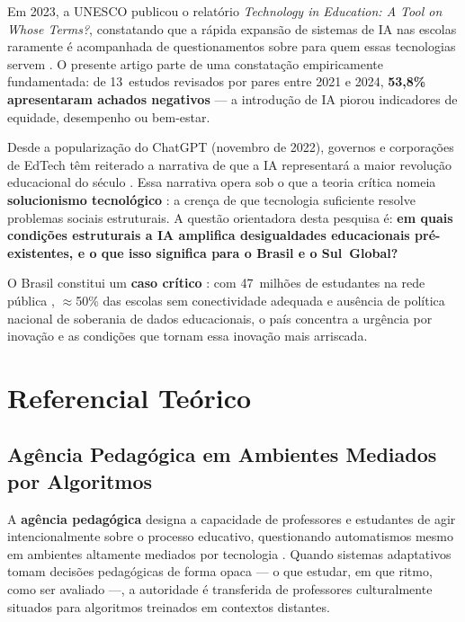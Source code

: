 \documentclass[preprint,12pt,authoryear]{elsarticle}
\begin{document}
Em 2023, a UNESCO publicou o relatório \textit{Technology in
Education: A Tool on Whose Terms?}, constatando que a rápida
expansão de sistemas de IA nas escolas raramente é acompanhada
de questionamentos sobre para quem essas tecnologias servem
\citep{UNESCO2023}.
O presente artigo parte de uma constatação empiricamente fundamentada:
de 13~estudos revisados por pares entre 2021 e 2024,
\textbf{53,8\% apresentaram achados negativos} --- a introdução de
IA piorou indicadores de equidade, desempenho ou bem-estar.

Desde a popularização do ChatGPT (novembro de 2022), governos
e corporações de EdTech têm reiterado a narrativa de que a IA
representará a maior revolução educacional do século
\citep{Holmes2022}.
Essa narrativa opera sob o que a teoria crítica nomeia
\textbf{solucionismo tecnológico} \citep{Morozov2013}: a crença
de que tecnologia suficiente resolve problemas sociais estruturais.
A questão orientadora desta pesquisa é: \textbf{em quais condições
estruturais a IA amplifica desigualdades educacionais pré-existentes,
e o que isso significa para o Brasil e o Sul~Global?}

O Brasil constitui um \textbf{caso crítico} \citep{Yin2018}: com
47~milhões de estudantes na rede pública \citep{INEP2023},
$\approx$50\% das escolas sem conectividade adequada
\citep{CGIbr2023} e ausência de política nacional de soberania de
dados educacionais, o país concentra a urgência por inovação e as
condições que tornam essa inovação mais arriscada.

\section{Referencial Teórico}

\subsection{Agência Pedagógica em Ambientes Mediados por Algoritmos}

A \textbf{agência pedagógica} designa a capacidade de professores e
estudantes de agir intencionalmente sobre o processo educativo,
questionando automatismos mesmo em ambientes altamente mediados por
tecnologia \citep{Biesta2022}.
Quando sistemas adaptativos tomam decisões pedagógicas de forma
opaca --- o que estudar, em que ritmo, como ser avaliado ---, a
autoridade é transferida de professores culturalmente situados para
algoritmos treinados em contextos distantes.
\end{document}
